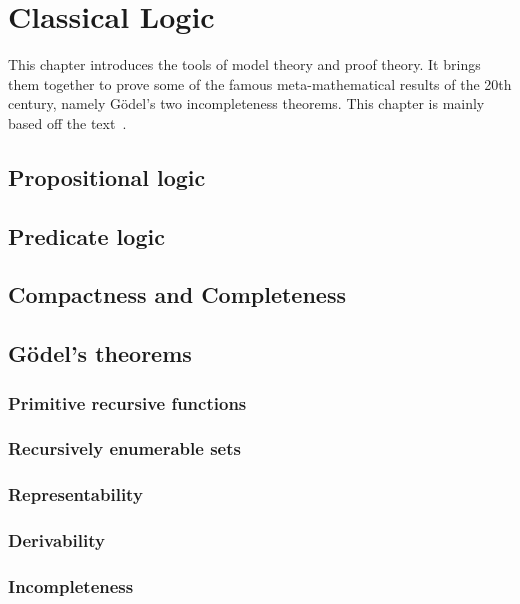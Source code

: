 \chapter{Classical Logic}
This chapter introduces the tools of model theory and proof theory. It brings them together to prove some of the famous meta-mathematical results of the 20th century, namely G\"odel's two incompleteness theorems. This chapter is mainly based off the text~\cite{vanDalen2012logic}.

\section{Propositional logic}

\section{Predicate logic}

\section{Compactness and Completeness}

\section{G\"odel's theorems}

\subsection{Primitive recursive functions}

\subsection{Recursively enumerable sets}

\subsection{Representability}

\subsection{Derivability}

\subsection{Incompleteness}

